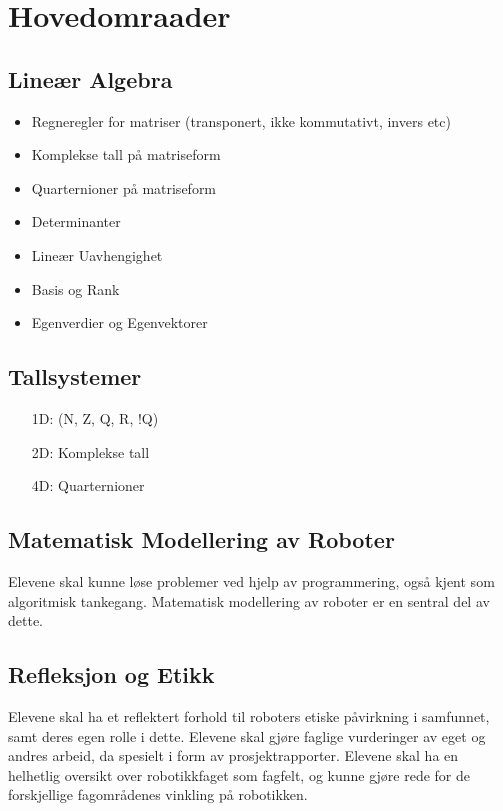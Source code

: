 \section*{Hovedomraader} \label{Sec: Hovedomraader}


\subsection*{Lineær Algebra}

    \begin{itemize}
        \item Regneregler for matriser (transponert, ikke kommutativt, invers etc)
        \item Komplekse tall på matriseform
        \item Quarternioner på matriseform
        \item Determinanter
        \item Lineær Uavhengighet
        \item Basis og Rank
        \item Egenverdier og Egenvektorer
    \end{itemize}


\subsection*{Tallsystemer}

    \begin{itemize}
        \item[1D:] (N, Z, Q, R, !Q)
        \item[2D:] Komplekse tall
        \item[4D:] Quarternioner
    \end{itemize}


\subsection*{Matematisk Modellering av Roboter}
    Elevene skal kunne løse problemer ved hjelp av programmering, også kjent som algoritmisk tankegang. Matematisk modellering av roboter er en sentral del av dette.


\subsection*{Refleksjon og Etikk}
    Elevene skal ha et reflektert forhold til roboters etiske påvirkning i samfunnet, samt deres egen rolle i dette.
    Elevene skal gjøre faglige vurderinger av eget og andres arbeid, da spesielt i form av prosjektrapporter.
    Elevene skal ha en helhetlig oversikt over robotikkfaget som fagfelt, og kunne gjøre rede for de forskjellige fagområdenes vinkling på robotikken.


